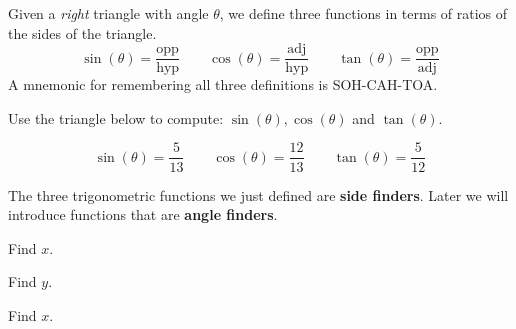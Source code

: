 \begin{definition}
  Given a \emph{right} triangle with angle \(\theta\), we define three
  functions in terms of ratios of the sides of the triangle.
  \begin{equation}
    \label{eq:sin-cos-tan}
    \sin(\theta) = \frac{\text{opp}}{\text{hyp}} \qquad
    \cos(\theta) = \frac{\text{adj}}{\text{hyp}} \qquad
    \tan(\theta) = \frac{\text{opp}}{\text{adj}}
  \end{equation}
  A mnemonic for remembering all three definitions is SOH-CAH-TOA.
\end{definition}

\begin{example}
  Use the triangle below to compute: \(\sin(\theta), \cos(\theta)\)
  and \(\tan(\theta)\).

  

\end{example}
\begin{solution}
  \[
    \sin(\theta) = \frac{5}{13} \qquad
    \cos(\theta) = \frac{12}{13} \qquad
    \tan(\theta) = \frac{5}{12}
  \]
\end{solution}

\newpage

The three trigonometric functions we just defined are \textbf{side
  finders}. Later we will introduce functions that are \textbf{angle
  finders}.


\begin{exercise}
  Find \(x\).

  

\end{exercise}

\begin{exercise}
  Find \(y\).

  

\end{exercise}

\begin{exercise}
  Find \(x\).

  

\end{exercise}

